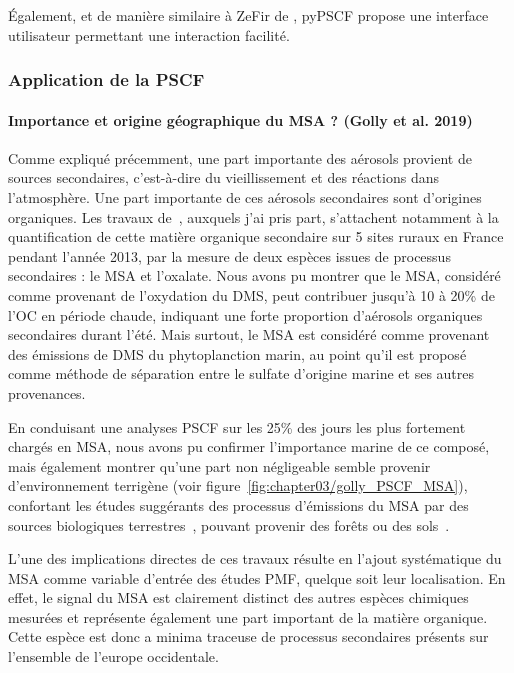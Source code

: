 Également, et de manière similaire à ZeFir de \textcite{petitUserfriendly2017}, pyPSCF
propose une interface utilisateur permettant une interaction facilité.

\subsubsection{Application de la PSCF}%
\label{ssub:application_de_la_pscf}

\paragraph{Importance et origine géographique du MSA ? (Golly et al. 2019)}%
\label{par:origine_terrestre_ou_marine_du_msa_}

Comme expliqué précemment, une part importante des aérosols provient de sources
secondaires, c'est-à-dire du vieillissement et des réactions dans l'atmosphère. Une part
importante de ces aérosols secondaires sont d'origines organiques. Les travaux
de~\textcite{gollyOrganic2019}, auxquels j'ai pris part, s'attachent notamment à la
quantification de cette matière organique secondaire sur 5 sites ruraux en France
pendant l'année 2013, par la mesure de deux espèces issues de processus secondaires : le
MSA et l'oxalate.  Nous avons pu montrer que le MSA, considéré comme provenant de
l'oxydation du DMS, peut contribuer jusqu'à 10 à 20\% de l'OC en période chaude,
indiquant une forte proportion d'aérosols organiques secondaires durant l'été. Mais
surtout, le MSA est considéré comme provenant des émissions de DMS du phytoplanction
marin, au point qu'il est proposé comme méthode de séparation entre le sulfate d'origine
marine et ses autres provenances.

En conduisant une analyses PSCF sur les 25\% des jours les plus fortement chargés en MSA,
nous avons pu confirmer l'importance marine de ce composé, mais également montrer qu'une
part non négligeable semble provenir d'environnement terrigène (voir
figure~\ref{fig:chapter03/golly_PSCF_MSA}), confortant les études suggérants des
processus d'émissions du MSA par des sources biologiques
terrestres~\autocite{bozzettiArgon2017}, pouvant provenir des forêts ou des
sols~\autocite{jardineDimethyl2015,miyazakiSeasonal2012}.

L'une des implications directes de ces travaux résulte en l'ajout systématique du MSA
comme variable d'entrée des études PMF, quelque soit leur localisation. En effet, le
signal du MSA est clairement distinct des autres espèces chimiques mesurées et représente
également une part important de la matière organique. Cette espèce est donc a minima
traceuse de processus secondaires présents sur l'ensemble de l'europe occidentale.

